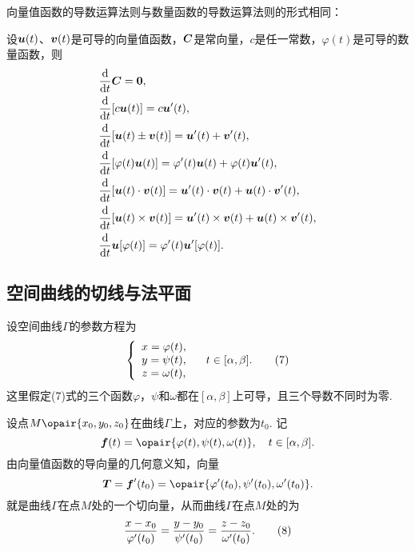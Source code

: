 向量值函数的导数运算法则与数量函数的导数运算法则的形式相同：
\begin{theorem}[向量值函数的导数运算法则]
设\(\boldsymbol{u}(t)\)、\(\boldsymbol{v}(t)\)是可导的向量值函数，\(\boldsymbol{C}\)是常向量，\(c\)是任一常数，\(\varphi(t)\)是可导的数量函数，则\begin{align}
&\dv{t} \boldsymbol{C} = \boldsymbol{0}, \\
&\dv{t} [c \boldsymbol{u}(t)] = c \boldsymbol{u}'(t), \\
&\dv{t} [\boldsymbol{u}(t) \pm \boldsymbol{v}(t)] = \boldsymbol{u}'(t) + \boldsymbol{v}'(t), \\
&\dv{t} [\varphi(t) \boldsymbol{u}(t)] = \varphi'(t) \boldsymbol{u}(t) + \varphi(t) \boldsymbol{u}'(t), \\
&\dv{t} [\boldsymbol{u}(t) \cdot \boldsymbol{v}(t)] = \boldsymbol{u}'(t) \cdot \boldsymbol{v}(t) + \boldsymbol{u}(t) \cdot \boldsymbol{v}'(t), \\
&\dv{t} [\boldsymbol{u}(t) \times \boldsymbol{v}(t)] = \boldsymbol{u}'(t) \times \boldsymbol{v}(t) + \boldsymbol{u}(t) \times \boldsymbol{v}'(t), \\
&\dv{t} \boldsymbol{u}[\varphi(t)] = \varphi'(t) \boldsymbol{u}'[\varphi(t)].
\end{align}
\end{theorem}

\subsection{空间曲线的切线与法平面}
设空间曲线\(\Gamma\)的参数方程为\begin{gather}
\left\{ \begin{array}{c}
x = \varphi(t), \\
y = \psi(t), \\
z = \omega(t), \\
\end{array} \right.
\quad
t \in [\alpha,\beta].
\tag7
\end{gather}这里假定(7)式的三个函数\(\varphi\)，\(\psi\)和\(\omega\)都在\([\alpha,\beta]\)上可导，且三个导数不同时为零.

设点\(M\opair{x_0,y_0,z_0}\)在曲线\(\Gamma\)上，对应的参数为\(t_0\).
记\[
\mat{f}(t)=\opair{\varphi(t),\psi(t),\omega(t)},
\quad t\in[\alpha,\beta].
\]由向量值函数的导向量的几何意义知，向量
\begin{equation}
\mat{T} = \mat{f}'(t_0) = \opair{\varphi'(t_0),\psi'(t_0),\omega'(t_0)}.
\end{equation}
就是曲线\(\Gamma\)在点\(M\)处的一个切向量，从而曲线\(\Gamma\)在点\(M\)处的为\begin{gather}
\frac{x-x_0}{\varphi'(t_0)}
=\frac{y-y_0}{\psi'(t_0)}
=\frac{z-z_0}{\omega'(t_0)}.
\tag8
\end{gather}

